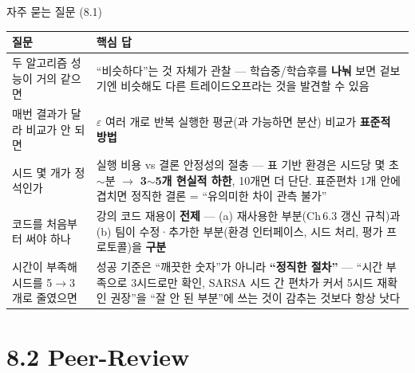 \documentclass[aspectratio=169,11pt]{beamer}
\begin{document}
\begin{frame}{자주 묻는 질문 (8.1)}
  \scriptsize
  \begin{tabular}{@{}p{}p{}@{}}
    \toprule
    질문 & 핵심 답 \\
    \midrule
    두 알고리즘 성능이 거의 같으면 & ``비슷하다''는 것 자체가 관찰 ---
      학습중/학습후를 \textbf{나눠} 보면 겉보기엔 비슷해도 다른
      트레이드오프라는 것을 발견할 수 있음 \\
    매번 결과가 달라 비교가 안 되면 & $\varepsilon$ 여러 개로 반복 실행한
      평균(과 가능하면 분산) 비교가 \textbf{표준적 방법} \\
    시드 몇 개가 정석인가 & 실행 비용 vs 결론 안정성의 절충 --- 표 기반
      환경은 시드당 몇 초$\sim$분 $\to$ \textbf{3$\sim$5개 현실적 하한},
      10개면 더 단단. 표준편차 1개 안에 겹치면 정직한 결론 =
      ``유의미한 차이 관측 불가'' \\
    코드를 처음부터 써야 하나 & 강의 코드 재용이 \textbf{전제} ---
      (a) 재사용한 부분(Ch\,6.3 갱신 규칙)과 (b) 팀이 수정·추가한
      부분(환경 인터페이스, 시드 처리, 평가 프로토콜)을 \textbf{구분} \\
    \midrule
    시간이 부족해 시드를 5$\to$3개로 줄였으면 & 성공 기준은 ``깨끗한
      숫자''가 아니라 \textbf{``정직한 절차''} --- ``시간 부족으로
      3시드로만 확인, SARSA 시드 간 편차가 커서 5시드 재확인 권장''을
      ``잘 안 된 부분''에 쓰는 것이 감추는 것보다 항상 낫다 \\
    \bottomrule
  \end{tabular}
\end{frame}

\section{8.2 Peer-Review}
\end{document}
